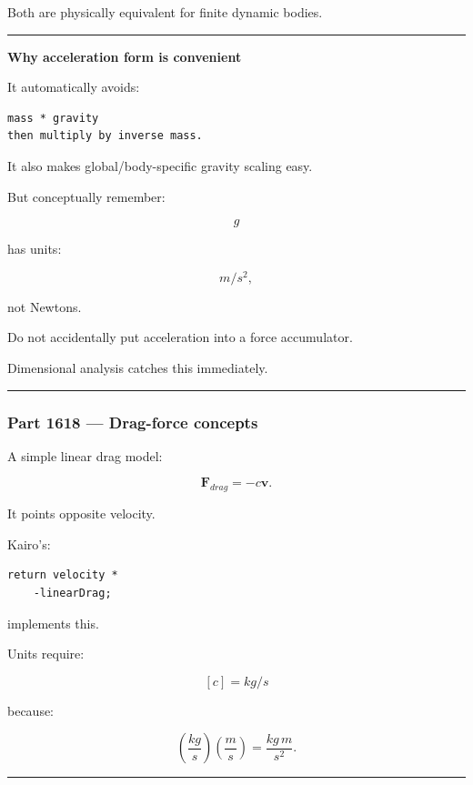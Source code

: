 Both are physically equivalent for finite dynamic bodies.

\begin{center}\rule{0.5\linewidth}{0.5pt}\end{center}

\textbf{Why acceleration form is convenient}

It automatically avoids:

\begin{verbatim}
mass * gravity
then multiply by inverse mass.
\end{verbatim}

It also makes global/body-specific gravity scaling easy.

But conceptually remember:

\[
g
\]

has units:

\[
m/s^2,
\]

not Newtons.

Do not accidentally put acceleration into a force accumulator.

Dimensional analysis catches this immediately.

\begin{center}\rule{0.5\linewidth}{0.5pt}\end{center}

\subsubsection{Part 1618 --- Drag-force concepts}\label{part-1618-drag-force-concepts}

A simple linear drag model:

\[
\boxed{
\mathbf{F}_{drag}
=
-c\mathbf{v}.
}
\]

It points opposite velocity.

Kairo's:

\begin{verbatim}
return velocity *
    -linearDrag;
\end{verbatim}

implements this.

Units require:

\[
[c]
=
kg/s
\]

because:

\[
\left(\frac{kg}{s}\right)
\left(\frac{m}{s}\right)
=
\frac{kg\,m}{s^2}.
\]

\begin{center}\rule{0.5\linewidth}{0.5pt}\end{center}

